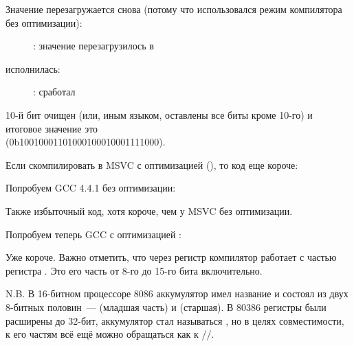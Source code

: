 \clearpage
Значение перезагружается снова (потому что использовался режим компилятора без оптимизации): 

\begin{figure}[H]
\centering
{}
\caption{\olly: значение перезагрузилось в \EDX}
\label{fig:set_reset_olly3}
\end{figure}

\clearpage
\AND исполнилась:

\begin{figure}[H]
\centering
{}
\caption{\olly: \AND сработал}
\label{fig:set_reset_olly4}
\end{figure}

10-й бит очищен (или, иным языком, оставлены все биты кроме 10-го) и итоговое значение это \\
 (0b1001000110100010001{\color{red}0}001111000).


Если скомпилировать в MSVC с оптимизацией (\Ox), то код еще короче:




Попробуем GCC 4.4.1 без оптимизации:



Также избыточный код, хотя короче, чем у MSVC без оптимизации.

Попробуем теперь GCC с оптимизацией \Othree:




Уже короче. Важно отметить, что через регистр \AH компилятор работает с частью регистра \EAX. 
Это его часть от 8-го до 15-го бита включительно.


N.B. В 16-битном процессоре 8086 аккумулятор имел название \AX 
и состоял из двух 8-битных половин~--- \AL (младшая часть) и \AH (старшая). 
В 80386 регистры были расширены до 32-бит, 
аккумулятор стал называться \EAX, но в целях совместимости, к его  частям всё ещё можно 
обращаться как к \AX/\AH/\AL.


